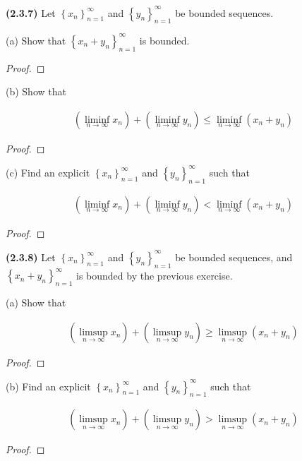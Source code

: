 \documentclass[12pt]{article}
\newcommand{\liminftoinf}[1][n]{\liminf_{ {#1} \to \infty}}
\newcommand{\limsuptoinf}[1][n]{\limsup_{ {#1} \to \infty}}
\newcommand{\seq}[2][n]{\left\{ {#2} \right\}_{#1=1}^\infty}
\newcommand{\paren}[1]{\left( {#1} \right)}
\begin{document}
\pagestyle{fancy}
\setlength{\headheight}{14.49998pt}
\fancyfoot[C]{\thepage}

\noindent \textbf{(2.3.7)} Let $\seq{x_n}$ and $\seq{y_n}$ be bounded sequences.

(a) Show that $\seq{x_n+y_n}$ is bounded.

\begin{proof}
	\lipsum[1]
\end{proof}

(b) Show that

\begin{align*}
	\paren{\liminftoinf x_n}+\paren{\liminftoinf y_n}\le\liminftoinf\paren{x_n+y_n}
\end{align*}

\begin{proof}
	\lipsum[1]
\end{proof}

(c) Find an explicit $\seq{x_n}$ and $\seq{y_n}$ such that

\begin{align*}
	\paren{\liminftoinf x_n}+\paren{\liminftoinf y_n}<\liminftoinf\paren{x_n+y_n}
\end{align*}

\begin{proof}
	\lipsum[1]
\end{proof}

\newpage

\noindent \textbf{(2.3.8)}  Let $\seq{x_n}$ and $\seq{y_n}$ be bounded sequences, and $\seq{x_n+y_n}$ is bounded by the previous exercise.

(a) Show that

\begin{align*}
	\paren{\limsuptoinf x_n}+\paren{\limsuptoinf y_n}\ge\limsuptoinf\paren{x_n+y_n}
\end{align*}

\begin{proof}
	\lipsum[1]
\end{proof}

(b) Find an explicit $\seq{x_n}$ and $\seq{y_n}$ such that

\begin{align*}
	\paren{\limsuptoinf x_n}+\paren{\limsuptoinf y_n}>\limsuptoinf\paren{x_n+y_n}
\end{align*}

\begin{proof}
	\lipsum[1]
\end{proof}
\end{document}
